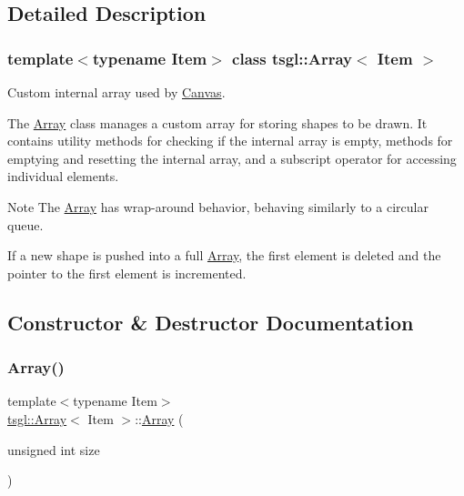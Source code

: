 \subsection{Detailed Description}
\subsubsection*{template$<$typename Item$>$\newline
class tsgl\+::\+Array$<$ Item $>$}

Custom internal array used by \hyperlink{classtsgl_1_1_canvas}{Canvas}. 

The \hyperlink{classtsgl_1_1_array}{Array} class manages a custom array for storing shapes to be drawn. It contains utility methods for checking if the internal array is empty, methods for emptying and resetting the internal array, and a subscript operator for accessing individual elements. \begin{DoxyNote}{Note}
The \hyperlink{classtsgl_1_1_array}{Array} has wrap-\/around behavior, behaving similarly to a circular queue. 

If a new shape is pushed into a full \hyperlink{classtsgl_1_1_array}{Array}, the first element is deleted and the pointer to the first element is incremented. 
\end{DoxyNote}


\subsection{Constructor \& Destructor Documentation}
\mbox{\label{classtsgl_1_1_array_acc018fe6db37e7eb5df06789de034904}} 
\subsubsection{\texorpdfstring{Array()}{Array()}}
{\footnotesize\ttfamily template$<$typename Item$>$ \\
\hyperlink{classtsgl_1_1_array}{tsgl\+::\+Array}$<$ Item $>$\+::\hyperlink{classtsgl_1_1_array}{Array} (\begin{DoxyParamCaption}\item[{unsigned int}]{size }\end{DoxyParamCaption})\hspace{0.3cm}{\ttfamily [inline]}}



